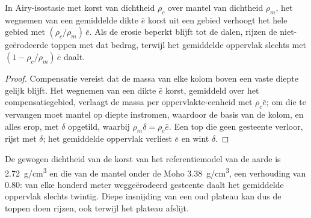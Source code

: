 \begin{proposition}\label{prop:b3:quantitative-geomorphology:rebound}
In Airy-isostasie met korst van dichtheid $\rho_c$ over mantel van dichtheid
$\rho_m$, het wegnemen van een gemiddelde dikte $\bar e$ korst uit een gebied verhoogt
het hele gebied met $(\rho_c/\rho_m)\,\bar e$. Als de erosie beperkt blijft tot de dalen, rijzen de
niet-geërodeerde toppen met dat bedrag, terwijl het gemiddelde oppervlak slechts
met $(1 - \rho_c/\rho_m)\,\bar e$ daalt.
\end{proposition}

\begin{proof}
Compensatie vereist dat de massa van elke kolom boven een vaste diepte
gelijk blijft. Het wegnemen van een dikte $\bar e$ korst, gemiddeld over het
compensatiegebied, verlaagt de massa per oppervlakte-eenheid met $\rho_c \bar e$;
om die te vervangen moet mantel op diepte instromen, waardoor de basis van de
kolom, en alles erop, met $\delta$ opgetild, waarbij $\rho_m \delta = \rho_c \bar
e$. Een top die geen gesteente verloor, rijst met $\delta$; het gemiddelde oppervlak verliest
$\bar e$ en wint $\delta$.
\end{proof}

De gewogen dichtheid van de korst van het referentiemodel van de aarde is
\qty{2.72}{g/cm^3} en die van de mantel onder de Moho \qty{3.38}{g/cm^3},
een verhouding van 0.80: van elke honderd meter weggeërodeerd gesteente daalt het gemiddelde
oppervlak slechts twintig. Diepe insnijding van een oud plateau kan dus de toppen
doen rijzen, ook terwijl het plateau afslijt.

